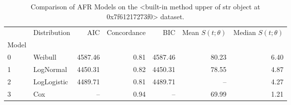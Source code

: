 \begin{table}
\caption{Comparison of AFR Models on the <built-in method upper of str object at 0x7f61217273f0> dataset.}
\label{tab:cifar10}
\begin{tabular}{llrrrrr}
\toprule
 & Distribution & AIC & Concordance & BIC & Mean $S(t;\theta)$ & Median $S(t;\theta)$ \\
Model &  &  &  &  &  &  \\
\midrule
0 & Weibull & 4587.46 & 0.81 & 4587.46 & 80.23 & 6.40 \\
1 & LogNormal & 4450.31 & 0.82 & 4450.31 & 78.55 & 4.87 \\
2 & LogLogistic & 4489.71 & 0.81 & 4489.71 & -- & 4.27 \\
3 & Cox & -- & 0.94 & -- & 69.99 & 1.21 \\
\bottomrule
\end{tabular}
\end{table}
